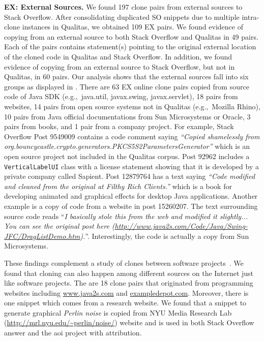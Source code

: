 \documentclass[10pt,journal,compsoc]{IEEEtran}
\begin{document}
\textbf{EX: External Sources.} We found 197 clone pairs from external sources to
Stack Overflow. After consolidating duplicated SO snippets due to multiple
intra-clone instances in Qualitas, we obtained 109 EX pairs. We found
evidence of copying from an external source to both Stack
Overflow and Qualitas in 49 pairs. Each of the pairs contains
statement(s) pointing to the original external location of the cloned
code in Qualitas and Stack Overflow. In addition, we found evidence
of copying from an external source to Stack Overflow, but not in
Qualitas, in 60 pairs. 
Our
analysis shows that the external sources fall into six groups as displayed in
. There are 63 EX online clone pairs copied
from source code of Java SDK (e.g.,\ \textsf{java.util}, \textsf{javax.swing}, \textsf{javax.servlet}), 
18 pairs from websites, 14 pairs from open
source systems not in Qualitas (e.g.,\ \textsf{Mozilla
	Rhino}), 10 pairs from Java official documentations from Sun
Microsystems or Oracle, 3 pairs from books, and 1 pair from a company
project. For example, Stack Overflow Post 9549009 contains a code comment saying
\textit{``Copied shamelessly from
	org.bouncycastle.crypto.generators.PKCS5S2ParametersGenerator''} which is an
open source project not included in the Qualitas corpus. Post 92962 includes a {\small\texttt{VerticalLabelUI}}
class with a license statement showing that it is developed by a private company
called \textsf{Sapient}. Post 12879764 has a text saying \textit{``Code modified
	and cleaned from the original at Filthy Rich Clients.''} which is a book for
developing animated and graphical effects for desktop Java applications. Another
example is a copy of code from a website in post 15260207. The text surrounding
source code reads ``\textit{I basically stole this from the web and modified it
	slightly... You can see the original post here
	(\url{http://www.java2s.com/Code/Java/Swing-JFC/DragListDemo.htm}).}''.
Interestingly, the code is actually a copy from Sun Microsystems.

These findings complement a study of clones between software
projects~\cite{Svajlenko2014}. We found that cloning can also happen among
different sources on the Internet just like software projects. The are 18 clone
pairs that originated from programming websites including \url{www.java2s.com}
and \url{exampledepot.com}. Moreover, there is one snippet which comes from a
research website. We found that a snippet to generate graphical \textit{Perlin
	noise} is copied from NYU Media Research Lab
(\url{http://mrl.nyu.edu/~perlin/noise/}) website and is used in both Stack Overflow
answer and the \textsf{aoi} project with attribution. 
\end{document}
